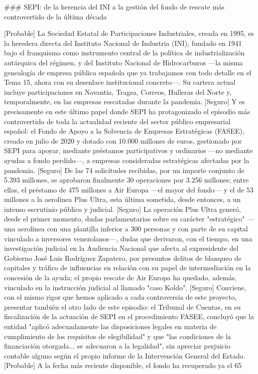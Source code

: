 \documentclass[10pt,a4paper]{article}
\begin{document}
### SEPI: de la herencia del INI a la gestión del fondo de rescate más controvertido de la última década

[Probable] La Sociedad Estatal de Participaciones Industriales, creada en 1995, es la heredera directa del Instituto Nacional de Industria (INI), fundado en 1941 bajo el franquismo como instrumento central de la política de industrialización autárquica del régimen, y del Instituto Nacional de Hidrocarburos —la misma genealogía de empresa pública española que ya trabajamos con todo detalle en el Tema 15, ahora con su desenlace institucional concreto—. Su cartera actual incluye participaciones en Navantia, Tragsa, Correos, Hulleras del Norte y, temporalmente, en las empresas rescatadas durante la pandemia. [Seguro] Y es precisamente en este último papel donde SEPI ha protagonizado el episodio más controvertido de toda la actualidad reciente del sector público empresarial español: el Fondo de Apoyo a la Solvencia de Empresas Estratégicas (FASEE), creado en julio de 2020 y dotado con 10.000 millones de euros, gestionado por SEPI para apoyar, mediante préstamos participativos y ordinarios —no mediante ayudas a fondo perdido—, a empresas consideradas estratégicas afectadas por la pandemia. [Seguro] De las 74 solicitudes recibidas, por un importe conjunto de 5.393 millones, se aprobaron finalmente 30 operaciones por 3.256 millones; entre ellas, el préstamo de 475 millones a Air Europa —el mayor del fondo— y el de 53 millones a la aerolínea Plus Ultra, esta última sometida, desde entonces, a un intenso escrutinio público y judicial. [Seguro] La operación Plus Ultra generó, desde el primer momento, dudas parlamentarias sobre su carácter "estratégico" —una aerolínea con una plantilla inferior a 300 personas y con parte de su capital vinculado a inversores venezolanos—, dudas que derivaron, con el tiempo, en una investigación judicial en la Audiencia Nacional que afecta al expresidente del Gobierno José Luis Rodríguez Zapatero, por presuntos delitos de blanqueo de capitales y tráfico de influencias en relación con su papel de intermediación en la concesión de la ayuda; el propio rescate de Air Europa ha quedado, además, vinculado en la instrucción judicial al llamado "caso Koldo". [Seguro] Conviene, con el mismo rigor que hemos aplicado a cada controversia de este proyecto, presentar también el otro lado de este episodio: el Tribunal de Cuentas, en su fiscalización de la actuación de SEPI en el procedimiento FASEE, concluyó que la entidad "aplicó adecuadamente las disposiciones legales en materia de cumplimiento de los requisitos de elegibilidad" y que "las condiciones de la financiación otorgada... se adecuaron a la legalidad", sin apreciar perjuicio contable alguno según el propio informe de la Intervención General del Estado. [Probable] A la fecha más reciente disponible, el fondo ha recuperado ya el 65%
\end{document}
